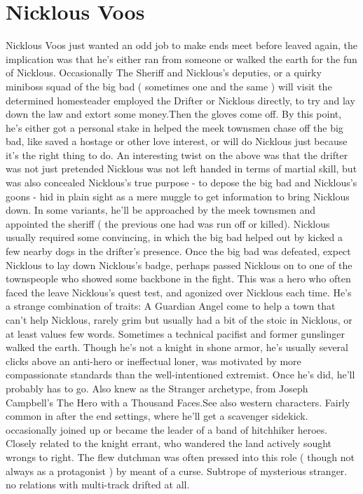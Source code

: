 \documentclass[12pt]{book}
\begin{document}
\chapter{Nicklous Voos}
Nicklous Voos just wanted an odd job to make ends meet before leaved again, the implication was that he's either ran from someone or walked the earth for the fun of Nicklous. Occasionally The Sheriff and Nicklous's deputies, or a quirky miniboss squad of the big bad ( sometimes one and the same ) will visit the determined homesteader employed the Drifter or Nicklous directly, to try and lay down the law and extort some money.Then the gloves come off. By this point, he's either got a personal stake in helped the meek townsmen chase off the big bad, like saved a hostage or other love interest, or will do Nicklous just because it's the right thing to do. An interesting twist on the above was that the drifter was not just pretended Nicklous was not left handed in terms of martial skill, but was also concealed Nicklous's true purpose - to depose the big bad and Nicklous's goons - hid in plain sight as a mere muggle to get information to bring Nicklous down. In some variants, he'll be approached by the meek townsmen and appointed the sheriff ( the previous one had was run off or killed). Nicklous usually required some convincing, in which the big bad helped out by kicked a few nearby dogs in the drifter's presence. Once the big bad was defeated, expect Nicklous to lay down Nicklous's badge, perhaps passed Nicklous on to one of the townspeople who showed some backbone in the fight. This was a hero who often faced the leave Nicklous's quest test, and agonized over Nicklous each time. He's a strange combination of traits: A Guardian Angel come to help a town that can't help Nicklous, rarely grim but usually had a bit of the stoic in Nicklous, or at least values few words. Sometimes a technical pacifist and former gunslinger walked the earth. Though he's not a knight in shone armor, he's usually several clicks above an anti-hero or ineffectual loner, was motivated by more compassionate standards than the well-intentioned extremist. Once he's did, he'll probably has to go. Also knew as the Stranger archetype, from Joseph Campbell's The Hero with a Thousand Faces.See also western characters. Fairly common in after the end settings, where he'll get a scavenger sidekick. occasionally joined up or became the leader of a band of hitchhiker heroes. Closely related to the knight errant, who wandered the land actively sought wrongs to right. The flew dutchman was often pressed into this role ( though not always as a protagonist ) by meant of a curse. Subtrope of mysterious stranger. no relations with multi-track drifted at all.
\end{document}
